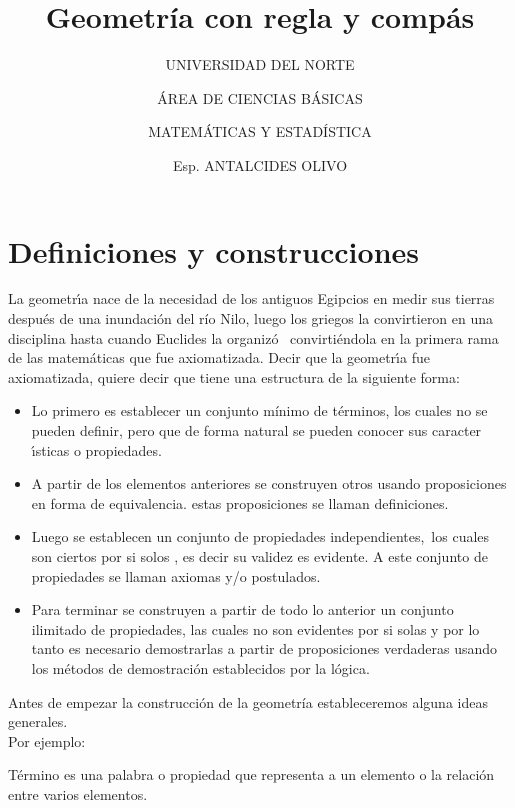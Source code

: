 \documentclass[12pt]{book}
\begin{document}
\frontmatter
\title{Geometr\'ia con regla y compás}
\author{UNIVERSIDAD DEL NORTE
\and \'{A}REA DE CIENCIAS B\'{A}SICAS
\and MATEM\'{A}TICAS Y ESTAD\'ISTICA
\and Esp. ANTALCIDES OLIVO}
\maketitle

\tableofcontents
\mainmatter
\thispagestyle{plain}
\setcounter{chapter}{0}
\setcounter{page}{1}
\bigskip
{}
\chapter{Definiciones y construcciones}
\label{chap:1}
\vskip 40pt
La geometr\'{\i}a nace de la necesidad de los antiguos Egipcios en medir sus
tierras despu\'{e}s de una inundaci\'{o}n del río Nilo, luego los griegos la
convirtieron en una disciplina hasta cuando Euclides la organiz\'{o} \
convirtiéndola en la primera rama de las matem\'{a}ticas que fue
axiomatizada.
Decir que la geometr\'{\i}a fue axiomatizada, quiere decir que tiene una
estructura de la siguiente forma:

\begin{itemize}
\item Lo primero es establecer un conjunto mínimo de t\'{e}rminos, los cuales no se
pueden definir, pero que de forma natural se pueden conocer sus caracter%
\'{\i}sticas o propiedades.

\item A partir de los elementos anteriores se construyen otros usando
proposiciones en forma de equivalencia. estas proposiciones se llaman
definiciones.

\item Luego se establecen un conjunto de propiedades independientes,\ los cuales son
ciertos por si solos , es decir su validez es evidente. A este conjunto de
propiedades se llaman axiomas y/o postulados.

\item Para terminar se construyen a partir de todo lo anterior un conjunto
ilimitado de propiedades, las cuales no son evidentes por si solas y por lo
tanto es necesario demostrarlas a partir de proposiciones verdaderas usando
los m\'{e}todos de demostraci\'{o}n establecidos por la lógica.
\end{itemize}
\newpage
 Antes de empezar la construcción de la geometría estableceremos alguna ideas generales.\\
Por ejemplo:
\begin{ideas}{Término es una palabra o propiedad que representa a un elemento o la relación entre varios elementos. }{}
\end{ideas}
\end{document}
